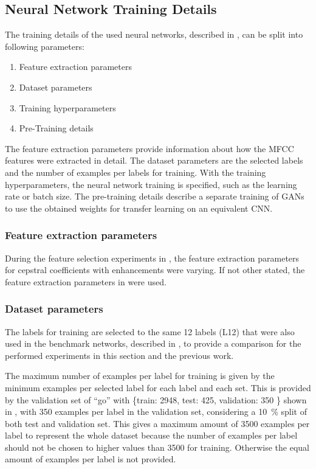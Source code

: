 
\subsection{Neural Network Training Details}\label{sec:exp_details_training}
The training details of the used neural networks, described in , can be split into following parameters:
\begin{enumerate}
  \item Feature extraction parameters
  \item Dataset parameters
  \item Training hyperparameters
  \item Pre-Training details
\end{enumerate}
The feature extraction parameters provide information about how the MFCC features were extracted in detail.
The dataset parameters are the selected labels and the number of examples per labels for training.
With the training hyperparameters, the neural network training is specified, such as the learning rate or batch size.
The pre-training details describe a separate training of GANs to use the obtained weights for transfer learning on an equivalent CNN.



\subsubsection{Feature extraction parameters}
During the feature selection experiments in , the feature extraction parameters for cepstral coefficients with enhancements were varying.
If not other stated, the feature extraction parameters in  were used.




\subsubsection{Dataset parameters}
The labels for training are selected to the same 12 labels (L12) that were also used in the benchmark networks, described in , to provide a comparison for the performed experiments in this section and the previous work.

The maximum number of examples per label for training is given by the minimum examples per selected label for each label and each set.
This is provided by the validation set of \enquote{go} with \{train: 2948, test: 425, validation: 350 \} shown in , with 350 examples per label in the validation set, considering a \SI{10}{\percent} split of both test and validation set.
This gives a maximum amount of 3500 examples per label to represent the whole dataset because the number of examples per label should not be chosen to higher values than 3500 for training.
Otherwise the equal amount of examples per label is not provided.

